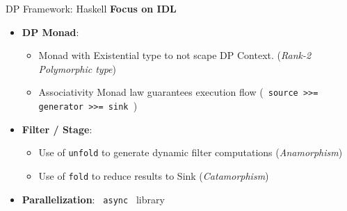 \documentclass{beamer}
\begin{document}
  \begin{frame}[fragile]{DP Framework: Haskell}
    \textbf{Focus on IDL}

    \begin{block}

      \begin{itemize}
        \item \textbf{DP Monad}: 
        \begin{itemize}
          \item Monad with Existential type to not scape DP Context. (\textit{Rank-2 Polymorphic type})
          \item Associativity Monad law guarantees execution flow (\texttt{ source >>= generator >>= sink }) 
        \end{itemize}
        \item \textbf{Filter / Stage}: 
        \begin{itemize}
          \item Use of \texttt{unfold} to generate dynamic filter computations (\textit{Anamorphism})
          \item Use of \texttt{fold} to reduce results to Sink (\textit{Catamorphism})
        \end{itemize}
        \item \textbf{Parallelization}: \texttt{ async } library
      \end{itemize}
      
    \end{block}
  \end{frame}
\end{document}
